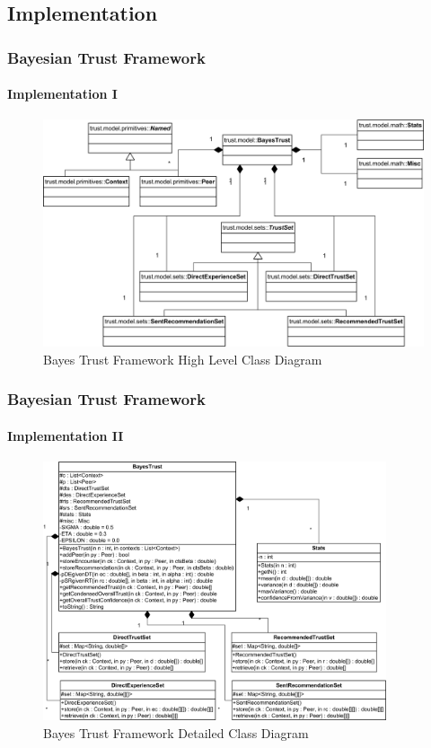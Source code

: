 \subsection{Implementation}
\begin{frame}
\frametitle{Bayesian Trust Framework}
\framesubtitle{Implementation I}

\begin{figure}[h!]
  \centering  
  \includegraphics[width=1\textwidth]{../report/images/bayestrust}
  \caption{Bayes Trust Framework High Level Class Diagram}
  \label{fig:xml2dttest}
\end{figure}

\end{frame}


\begin{frame}
\frametitle{Bayesian Trust Framework}
\framesubtitle{Implementation II}

\begin{figure}[h!]
  \centering  
  \includegraphics[width=0.9\textwidth]{../report/images/bayestrustdetail}
  \caption{Bayes Trust Framework Detailed Class Diagram}
  \label{fig:xml2dttest}
\end{figure}

\end{frame}